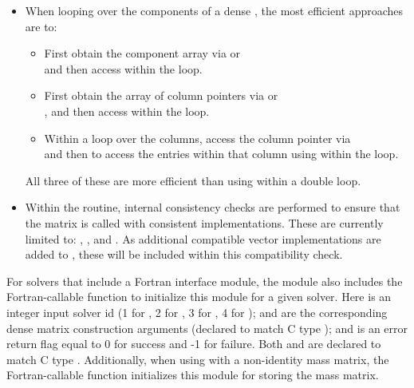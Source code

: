 \begin{itemize}
                                        
\item
  When looping over the components of a dense  ,
  the most efficient approaches are to:
  \begin{itemize}
    \item First obtain the component array via  or\\
     and then
    access  within the loop.
  
    \item First obtain the array of column pointers via  or\\
    , and then
    access  within the loop. 
  
    \item Within a loop over the columns, access the column pointer via\\
     and then to access the
    entries within that column using  within the loop.
  \end{itemize}
  All three of these are more efficient than
  using  within a double loop.

\item
  {\warn} Within the  routine, internal
  consistency checks are performed to ensure that the matrix is called
  with consistent {\nvector} implementations.  These are currently
  limited to: {\nvecs}, {\nvecopenmp}, and {\nvecpthreads}.  As additional
  compatible vector implementations are added to {\sundials}, these
  will be included within this compatibility check.

\end{itemize}

For solvers that include a Fortran interface module, the {\sunmatdense}
module also includes the Fortran-callable
function  to initialize
this {\sunmatdense} module for a given {\sundials} solver.
Here  is an integer input solver id (1 for {\cvode}, 2 for {\ida}, 3
for {\kinsol}, 4 for {\arkode});  and  are the
corresponding dense matrix construction arguments (declared to
match C type ); and  is an error return flag 
equal to 0 for success and -1 for failure. Both  and 
are declared to match C type . Additionally, when using
{\arkode} with a non-identity mass matrix, the Fortran-callable
function  initializes this
{\sunmatdense} module for storing the mass matrix. 
